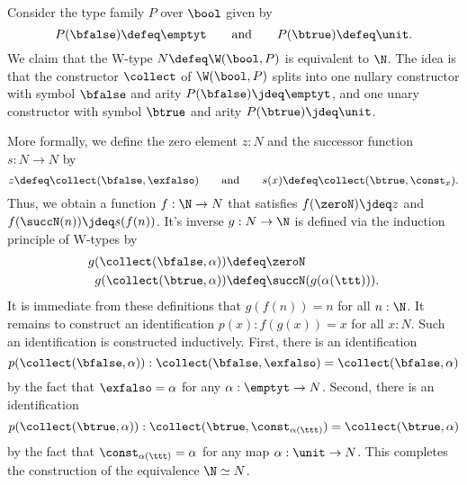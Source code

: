 \begin{eg}\label{eg:Nat-W}
  Consider the type family $P$ over $\bool$ given by
  \begin{equation*}
    P(\bfalse) \defeq \emptyt \qquad\text{and}\qquad P(\btrue) \defeq \unit.
  \end{equation*}
  We claim that the W-type $N\defeq \W(\bool,P)$ is equivalent to $\N$. The idea is that the constructor $\collect$ of $\W(\bool,P)$ splits into one nullary constructor with symbol $\bfalse$ and arity $P(\bfalse)\jdeq\emptyt$, and one unary constructor with symbol $\btrue$ and arity $P(\btrue)\jdeq\unit$.

  More formally, we define the zero element $z:N$ and the successor function $s:N\to N$ by
  \begin{equation*}
    z\defeq \collect(\bfalse,\exfalso) \qquad\text{and}\qquad s(x)\defeq \collect(\btrue,\const_x).
  \end{equation*}
  Thus, we obtain a function $f:\N\to N$ that satisfies $f(\zeroN)\jdeq z$ and $f(\succN(n))\jdeq s(f(n))$. It's inverse $g:N\to \N$ is defined via the induction principle of W-types by
  \begin{align*}
    g(\collect(\bfalse,\alpha)) & \defeq \zeroN \\
    g(\collect(\btrue,\alpha)) & \defeq \succN(g(\alpha(\ttt))).
  \end{align*}
  It is immediate from these definitions that $g(f(n))=n$ for all $n:\N$. It remains to construct an identification $p(x):f(g(x))=x$ for all $x:N$. Such an identification is constructed inductively. First, there is an identification
  \begin{equation*}
    p(\collect(\bfalse,\alpha)) : \collect(\bfalse,\exfalso)=\collect(\bfalse,\alpha)
  \end{equation*}
  by the fact that $\exfalso=\alpha$ for any $\alpha:\emptyt\to N$. Second, there is an identification
  \begin{equation*}
    p(\collect(\btrue,\alpha)) : \collect(\btrue,\const_{\alpha(\ttt)})=\collect(\btrue,\alpha)
  \end{equation*}
  by the fact that $\const_{\alpha(\ttt)}=\alpha$ for any map $\alpha:\unit\to N$. This completes the construction of the equivalence $\N\simeq N$.
\end{eg}

